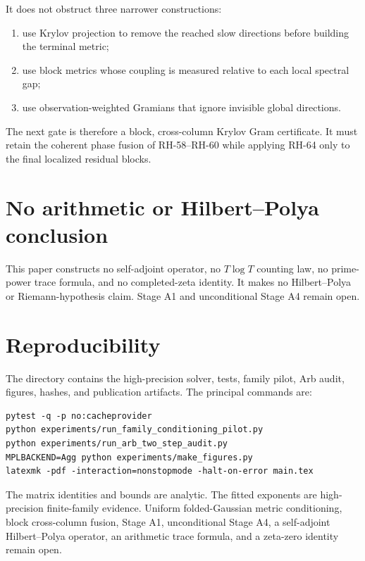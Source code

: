 \documentclass[11pt]{article}
\begin{document}
It does not obstruct three narrower constructions:
\begin{enumerate}[leftmargin=2.2em]
 \item use Krylov projection to remove the reached slow directions before
       building the terminal metric;
 \item use block metrics whose coupling is measured relative to each local
       spectral gap;
 \item use observation-weighted Gramians that ignore invisible global
       directions.
\end{enumerate}
The next gate is therefore a block, cross-column Krylov Gram certificate.
It must retain the coherent phase fusion of RH-58--RH-60 while applying
RH-64 only to the final localized residual blocks.

\section{No arithmetic or Hilbert--Polya conclusion}

This paper constructs no self-adjoint operator, no $T\log T$ counting law,
no prime-power trace formula, and no completed-zeta identity.  It makes no
Hilbert--Polya or Riemann-hypothesis claim.  Stage A1 and unconditional Stage
A4 remain open.

\section{Reproducibility}

The directory contains the high-precision solver, tests, family pilot, Arb
audit, figures, hashes, and publication artifacts.  The principal commands
are:
\begin{verbatim}
pytest -q -p no:cacheprovider
python experiments/run_family_conditioning_pilot.py
python experiments/run_arb_two_step_audit.py
MPLBACKEND=Agg python experiments/make_figures.py
latexmk -pdf -interaction=nonstopmode -halt-on-error main.tex
\end{verbatim}

The matrix identities and bounds are analytic.  The fitted exponents are
high-precision finite-family evidence.  Uniform folded-Gaussian metric
conditioning, block cross-column fusion, Stage A1, unconditional Stage A4,
a self-adjoint Hilbert--Polya operator, an arithmetic trace formula, and a
zeta-zero identity remain open.



\end{document}
